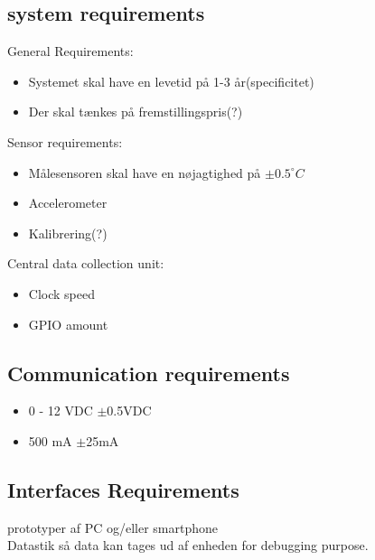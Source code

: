 \subsection{system requirements }
General Requirements:\\
\begin{itemize}
\item Systemet skal have en levetid på 1-3 år(specificitet)
\item Der skal tænkes på fremstillingspris(?)
\end{itemize}
Sensor requirements:\\
\begin{itemize}
\item Målesensoren skal have en nøjagtighed på $\pm0.5 ^{\circ}C$
\item Accelerometer
\item Kalibrering(?)
\end{itemize}
Central data collection unit:\\
\begin{itemize}
\item Clock speed
\item GPIO amount
\end{itemize}


\subsection{Communication requirements}
\begin{itemize}
\item 0 - 12 VDC $\pm$0.5VDC
\item 500 mA $\pm$25mA
\end{itemize}

\subsection{Interfaces Requirements}
prototyper af PC og/eller smartphone\\
Datastik så data kan tages ud af enheden for debugging purpose.\\

